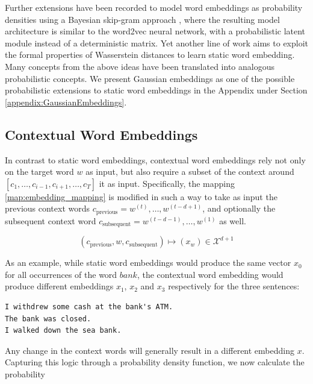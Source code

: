 \documentclass[a4paper,12pt,oneside,openright]{report}
\begin{document}
Further extensions have been recorded to model word embeddings as probability densities using a Bayesian skip-gram approach \cite{brazinskas19}, where the resulting model architecture is similar to the word2vec neural network, with a probabilistic latent module instead of a deterministic matrix.
Yet another line of work \cite{yan19} aims to exploit the formal properties of Wasserstein distances to learn static word embedding.
Many concepts from the above ideas have been translated into analogous probabilistic concepts.
We present Gaussian embeddings as one of the possible probabilistic  extensions to static word embeddings in the Appendix under Section \ref{appendix:GaussianEmbeddings}.

\subsection{Contextual Word Embeddings}

In contrast to static word embeddings, contextual word embeddings rely not only on the target word $w$ as input, but also require a subset of the context around $[c_1, \ldots, c_{i-1}, c_{i+1}, \ldots, c_T]$ it as input.
Specifically, the mapping \eqref{map:embedding_mapping} is modified in such a way to take as input the previous context words $c_\text{previous} = w^{(t)}, \ldots, w^{(t-d + 1)}$, and optionally the subsequent context word $c_\text{subsequent} = w^{(t-d - 1)}, \ldots, w^{(1)}$ as well.

\begin{equation}
(c_\text{previous}, w, c_\text{subsequent}) \mapsto (x_w) \in \mathcal{X}^{d + 1}
\end{equation}{\label{map:context_embedding_mapping}}

As an example, while static word embeddings would produce the same vector $x_0$ for all occurrences of the word $bank$, the contextual word embedding would produce different embeddings $x_1$, $x_2$ and $x_3$ respectively for the three sentences:

\begin{tcolorbox}
\begin{verbatim}
I withdrew some cash at the bank's ATM.
The bank was closed.
I walked down the sea bank.
\end{verbatim}
\end{tcolorbox}

Any change in the context words will generally result in a different embedding $x$.
Capturing this logic through a probability density function, we now calculate the probability
\end{document}
